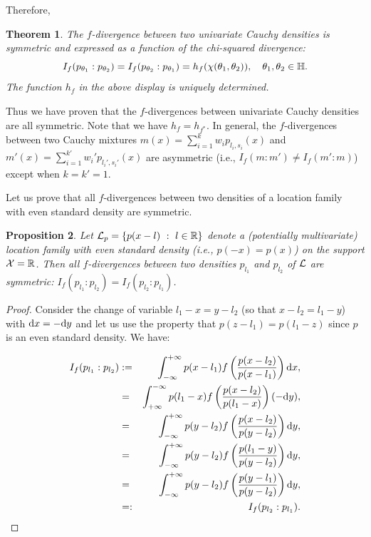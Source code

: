 \documentclass[journal]{IEEEtran}
\newtheorem{theorem}{Theorem}
\newtheorem{proposition}[theorem]{Proposition}
\begin{document}
Therefore, 
\begin{theorem}\label{thm:fdivchisquared}
The $f$-divergence between two univariate Cauchy densities is symmetric and expressed as a function of the chi-squared divergence: 
\begin{equation}\label{rep}
I_f(p_{\theta_1}:p_{\theta_2}) = I_f(p_{\theta_2}:p_{\theta_1}) = h_f(\chi(\theta_1,\theta_2)), \quad \theta_1,\theta_2 \in \bbH.
\end{equation} 
The function $h_f$ in the above display is uniquely determined. 
\end{theorem} 

Thus we have proven that the $f$-divergences between univariate Cauchy densities are all symmetric.
Note that we have $h_f=h_{f^*}$.
In general, the $f$-divergences between two Cauchy mixtures $m(x)=\sum_{i=1}^{k} w_i p_{l_i,s_i}(x)$ and 
$m'(x)=\sum_{i=1}^{k'} w_i' p_{l_i',s_i'}(x)$ are asymmetric (i.e., $I_f(m:m')\not=I_f(m':m)$) except when $k=k'=1$.

Let us prove that all $f$-divergences between two densities of a location family with even standard density are symmetric. 
\begin{proposition}\label{prop:fdivlocation}
Let $\mathcal{L}_p=\{p(x-l)\ :\ l\in{\mathbb{R}}\}$ denote a (potentially multivariate) location family with even standard density (i.e., $p(-x)=p(x)$) on the support $\mathcal{X}={\mathbb{R}}$.
Then all $f$-divergences between two densities $p_{l_1}$ and $p_{l_2}$ of $\mathcal{L}$ are symmetric: 
$I_f(p_{l_1}:p_{l_2})=I_f(p_{l_2}:p_{l_1})$.
\end{proposition}

\begin{proof}
Consider the change of variable $l_1-x=y-l_2$ (so that $x-l_2=l_1-y$) with $\mathrm{d}x=-\mathrm{d}y$ and let us use the property that $p(z-l_1)=p(l_1-z)$ since $p$ is an even standard density.
We have:

\begin{eqnarray*}
I_f(p_{l_1}:p_{l_2}) &:=& \int_{-\infty}^{+\infty} p(x-l_1) f\left(\frac{p(x-l_2)}{p(x-l_1)}\right) \mathrm{d}x,\\
&=& \int_{+\infty}^{-\infty} p(l_1-x) f\left(\frac{p(x-l_2)}{p(l_1-x)}\right)  (-\mathrm{d}y),\\
&=&  \int_{-\infty}^{+\infty} p(y-l_2) f\left(\frac{p(x-l_2)}{p(y-l_2)}\right)  \mathrm{d}y,\\
&=& \int_{-\infty}^{+\infty} p(y-l_2) f\left(\frac{p(l_1-y)}{p(y-l_2)}\right)  \mathrm{d}y,\\
&=& \int_{-\infty}^{+\infty} p(y-l_2) f\left(\frac{p(y-l_1)}{p(y-l_2)}\right)  \mathrm{d}y,\\
&=:& I_f(p_{l_2}:p_{l_1}).
\end{eqnarray*}
\end{proof}
\end{document}
